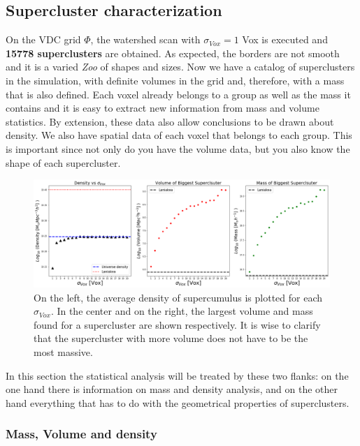 \subsection{Supercluster characterization}

On the VDC grid $\Phi$, the watershed scan with $\sigma_{Vox} = 1$ Vox is executed and \textbf{15778 superclusters} are obtained. As expected, the borders are not smooth and it is a varied \emph{Zoo} of shapes and sizes. Now we have a catalog of superclusters in the simulation, with definite volumes in the grid and, therefore, with a mass that is also defined. Each voxel already belongs to a group as well as the mass it contains and it is easy to extract new information from mass and volume statistics. By extension, these data also allow conclusions to be drawn about density. We also have spatial data of each voxel that belongs to each group. This is important since not only do you have the volume data, but you also know the shape of each supercluster. 

\begin{figure}[!h]
    \centering
    \includegraphics[width=450pt]{DensidadSigma.png}
    \caption{On the left, the average density of supercumulus is plotted for each $\sigma_{Vox}$. In the center and on the right, the largest volume and mass found for a supercluster are shown respectively. It is wise to clarify that the supercluster with more volume does not have to be the most massive.}
    \label{fig:DensMassVolLani}
\end{figure}

In this section the statistical analysis will be treated by these two flanks: on the one hand there is information on mass and density analysis, and on the other hand everything that has to do with the geometrical properties of superclusters.

\subsubsection{Mass, Volume and density}

